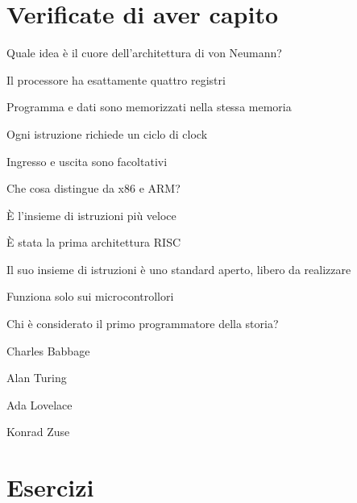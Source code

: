 



\section{Verificate di aver capito}

\begin{quiz}{Quale idea è il cuore dell'architettura di von Neumann?}
\item Il processore ha esattamente quattro registri
\item Programma e dati sono memorizzati nella stessa memoria
\item Ogni istruzione richiede un ciclo di clock
\item Ingresso e uscita sono facoltativi
\end{quiz}

\begin{quiz}{Che cosa distingue \riscv da x86 e ARM?}
\item È l'insieme di istruzioni più veloce
\item È stata la prima architettura RISC
\item Il suo insieme di istruzioni è uno standard aperto, libero da realizzare
\item Funziona solo sui microcontrollori
\end{quiz}

\begin{quiz}{Chi è considerato il primo programmatore della storia?}
\item Charles Babbage
\item Alan Turing
\item Ada Lovelace
\item Konrad Zuse
\end{quiz}

\section{Esercizi}

